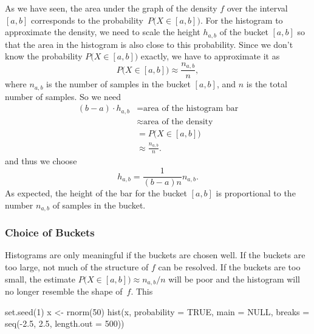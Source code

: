 \documentclass[
  a4paper,
]{article}
\newenvironment{Shaded}{\begin{snugshade}}{\end{snugshade}}
\newcommand{\AttributeTok}[1]{\textcolor[rgb]{0.77,0.63,0.00}{#1}}
\newcommand{\ConstantTok}[1]{\textcolor[rgb]{0.00,0.00,0.00}{#1}}
\newcommand{\DecValTok}[1]{\textcolor[rgb]{0.00,0.00,0.81}{#1}}
\newcommand{\FloatTok}[1]{\textcolor[rgb]{0.00,0.00,0.81}{#1}}
\newcommand{\FunctionTok}[1]{\textcolor[rgb]{0.00,0.00,0.00}{#1}}
\newcommand{\NormalTok}[1]{#1}
\newcommand{\OtherTok}[1]{\textcolor[rgb]{0.56,0.35,0.01}{#1}}
\newcommand{\SpecialCharTok}[1]{\textcolor[rgb]{0.00,0.00,0.00}{#1}}
\theoremstyle{definition}
\theoremstyle{definition}
\theoremstyle{definition}
\theoremstyle{definition}
\theoremstyle{remark}
\begin{document}
As we have seen, the area under the graph of the density \(f\) over the
interval \([a, b]\) corresponds to the probability~\(P\bigl(X \in [a,b]\bigr)\). For the histogram to approximate the density, we need
to scale the height \(h_{a,b}\) of the bucket \([a, b]\) so that the area
in the histogram is also close to this probability. Since we don't
know the probability \(P\bigl(X \in [a,b]\bigr)\) exactly, we have to
approximate it as
\begin{equation*}
  P\bigl(X \in [a,b]\bigr)
  \approx \frac{n_{a,b}}{n},
\end{equation*}
where \(n_{a,b}\) is the number of samples in the bucket \([a,b]\),
and \(n\) is the total number of samples. So we need
\begin{align*}
  (b-a) \cdot h_{a,b}
    &= \mbox{area of the histogram bar} \\
    &\approx \mbox{area of the density} \\
    &= P\bigl(X \in [a,b]\bigr) \\
    &\approx \frac{n_{a,b}}{n}.
\end{align*}
and thus we choose
\begin{equation*}
  h_{a,b}
  = \frac{1}{(b - a) n} n_{a,b}.
\end{equation*}
As expected, the height of the bar for the bucket \([a,b]\) is proportional
to the number \(n_{a,b}\) of samples in the bucket.

\hypertarget{choice-of-buckets}{%
\subsubsection{Choice of Buckets}\label{choice-of-buckets}}

Histograms are only meaningful if the buckets are chosen well. If
the buckets are too large, not much of the structure of \(f\) can be
resolved. If the buckets are too small, the estimate \(P\bigl(X \in [a,b]\bigr) \approx n_{a,b}/n\) will be poor and the histogram will
no longer resemble the shape of~\(f\). This



\begin{Shaded}
\begin{Highlighting}[]
\FunctionTok{set.seed}\NormalTok{(}\DecValTok{1}\NormalTok{)}
\NormalTok{x }\OtherTok{\textless{}{-}} \FunctionTok{rnorm}\NormalTok{(}\DecValTok{50}\NormalTok{)}
\FunctionTok{hist}\NormalTok{(x, }\AttributeTok{probability =} \ConstantTok{TRUE}\NormalTok{, }\AttributeTok{main =} \ConstantTok{NULL}\NormalTok{,}
     \AttributeTok{breaks =} \FunctionTok{seq}\NormalTok{(}\SpecialCharTok{{-}}\FloatTok{2.5}\NormalTok{, }\FloatTok{2.5}\NormalTok{, }\AttributeTok{length.out =} \DecValTok{500}\NormalTok{))}
\end{Highlighting}
\end{Shaded}
\end{document}

